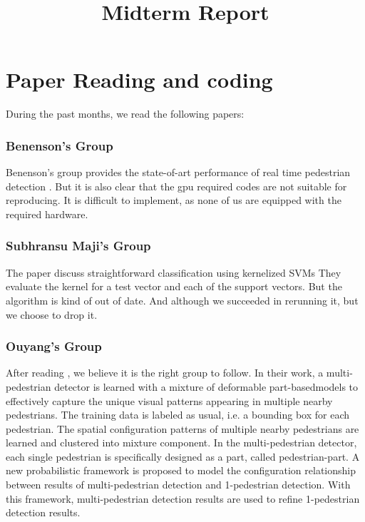 \documentclass[conference]{IEEEtran}
\begin{document}
\title{Midterm Report}
\author{
      \small{}
	}
\maketitle
\section{Paper Reading and coding}
During the past months, we read the following papers:
\subsubsection{Benenson's Group}
Benenson's group provides the state-of-art performance of real time pedestrian detection \cite{R1,R2,R3,R4,R5}.
But it is also clear that the gpu required codes are not suitable for reproducing.
It is difficult to implement, as none of us are equipped with the required hardware.
\subsubsection{Subhransu Maji's Group}
The paper \cite{M1} discuss straightforward classification using kernelized SVMs
They evaluate the kernel for a test vector and each of the support vectors. 
But the algorithm is kind of out of date. 
And although we succeeded in rerunning it, but we choose to drop it.
\subsubsection{Ouyang's Group}
After reading \cite{W1,W2,W3,W4,W5}, we believe it is the right group to follow.
In their work, a multi-pedestrian detector is learned
with a mixture of deformable part-basedmodels
to effectively capture the unique visual patterns appearing in multiple nearby pedestrians. 
The training data is labeled as usual, i.e. a bounding box for each pedestrian. 
The spatial configuration patterns of multiple nearby pedestrians are learned and clustered into mixture component.  
In the multi-pedestrian detector, each single pedestrian is specifically designed as a part, 
called pedestrian-part. 
A new probabilistic framework is proposed to model the configuration relationship between results of multi-pedestrian detection and 1-pedestrian detection.
With this framework, multi-pedestrian detection results are used to refine 1-pedestrian detection results.
\end{document}
